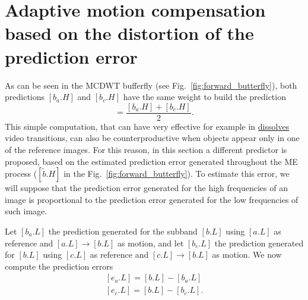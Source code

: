 


\section{Adaptive motion compensation based on the distortion of the prediction error}

As can be seen in the MCDWT bufferfly (see
Fig.~\ref{fig:forward_butterfly}), both predictions $[b_a.H]$ and
$[b_c.H]$ have the same weight to build the prediction
\begin{equation}
  [\hat{b.H}] = \frac{[b_a.H] + [b_c.H]}{2}.
\end{equation}
This simple computation, that can have very effective for example in
\href{https://biteable.com/blog/tips/video-transitions-effects-examples/}{dissolves}
video transitions, can also be counterproductive when objects appear
only in one of the reference images. For this reason, in this section
a different predictor is proposed, based on the estimated prediction
error generated throughout the ME process ($[\tilde{b}.H]$ in the
Fig.~\ref{fig:forward_butterfly}). To estimate this error, we will
suppose that the prediction error generated for the high frequencies
of an image is proportional to the prediction error generated for the
low frequencies of such image.

Let $[b_a.L]$ the prediction generated for the subband $[b.L]$ using
$[a.L]$ as reference and $[a.L]\rightarrow [b.L]$ as motion, and let
$[b_c.L]$ the prediction generated for $[b.L]$ using $[c.L]$ as
reference and $[c.L]\rightarrow [b.L]$ as motion. We now compute the
prediction errors
\begin{equation}
  \begin{array}{l}
    {[e_a.L]} = [b.L] - [b_a.L]\\
    {[e_c.L]} = [b.L] - [b_c.L].
  \end{array}
\end{equation}

